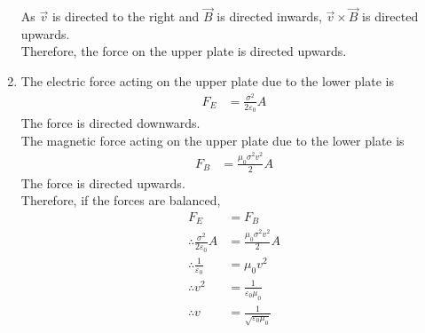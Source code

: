\documentclass[fleqn, a4paper, 11pt, oneside]{amsart}
\theoremstyle{definition}
\theoremstyle{theorem}
\begin{document}
\begin{solution}
\begin{enumerate}[leftmargin = *]
			As $\overrightarrow{v}$ is directed to the right and $\overrightarrow{B}$ is directed inwards, $\overrightarrow{v} \times \overrightarrow{B}$ is directed upwards.\\
			Therefore, the force on the upper plate is directed upwards.
		\item
			The electric force acting on the upper plate due to the lower plate is
			\begin{align*}
				F_E & = \frac{\sigma^2}{2 \varepsilon_0} A
			\end{align*}
			The force is directed downwards.\\
			The magnetic force acting on the upper plate due to the lower plate is
			\begin{align*}
				F_B & = \frac{\mu_0 \sigma^2 v^2}{2} A
			\end{align*}
			The force is directed upwards.\\
			Therefore, if the forces are balanced,
			\begin{align*}
				F_E                                           & = F_B                            \\
				\therefore \frac{\sigma^2}{2 \varepsilon_0} A & = \frac{\mu_0 \sigma^2 v^2}{2} A \\
				\therefore \frac{1}{\varepsilon_0}            & = \mu_0 v^2                      \\
				\therefore v^2                                & = \frac{1}{\varepsilon_0 \mu_0}  \\
				\therefore v                                  & = \frac{1}{\sqrt{\varepsilon_0 \mu_0}}
			\end{align*}
	\end{enumerate}
\end{solution}
\end{document}
